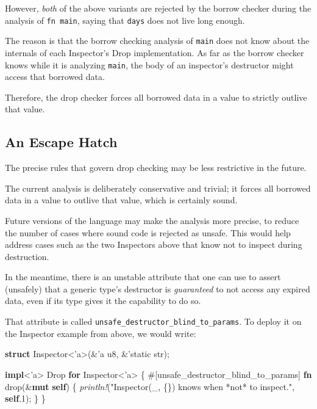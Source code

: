 \documentclass[a4paper,]{book}
\newenvironment{Shaded}{\begin{snugshade}}{\end{snugshade}}
\newcommand{\KeywordTok}[1]{\textcolor[rgb]{0.13,0.29,0.53}{\textbf{{#1}}}}
\newcommand{\DataTypeTok}[1]{\textcolor[rgb]{0.13,0.29,0.53}{{#1}}}
\newcommand{\DecValTok}[1]{\textcolor[rgb]{0.00,0.00,0.81}{{#1}}}
\newcommand{\StringTok}[1]{\textcolor[rgb]{0.31,0.60,0.02}{{#1}}}
\newcommand{\OtherTok}[1]{\textcolor[rgb]{0.56,0.35,0.01}{{#1}}}
\newcommand{\BuiltInTok}[1]{{#1}}
\newcommand{\PreprocessorTok}[1]{\textcolor[rgb]{0.56,0.35,0.01}{\textit{{#1}}}}
\newcommand{\AttributeTok}[1]{\textcolor[rgb]{0.77,0.63,0.00}{{#1}}}
\newcommand{\NormalTok}[1]{{#1}}
\begin{document}
However, \emph{both} of the above variants are rejected by the borrow
checker during the analysis of \texttt{fn\ main}, saying that
\texttt{days} does not live long enough.

The reason is that the borrow checking analysis of \texttt{main} does
not know about the internals of each Inspector's Drop implementation. As
far as the borrow checker knows while it is analyzing \texttt{main}, the
body of an inspector's destructor might access that borrowed data.

Therefore, the drop checker forces all borrowed data in a value to
strictly outlive that value.

\subsection{An Escape Hatch}\label{an-escape-hatch}

The precise rules that govern drop checking may be less restrictive in
the future.

The current analysis is deliberately conservative and trivial; it forces
all borrowed data in a value to outlive that value, which is certainly
sound.

Future versions of the language may make the analysis more precise, to
reduce the number of cases where sound code is rejected as unsafe. This
would help address cases such as the two Inspectors above that know not
to inspect during destruction.

In the meantime, there is an unstable attribute that one can use to
assert (unsafely) that a generic type's destructor is \emph{guaranteed}
to not access any expired data, even if its type gives it the capability
to do so.

That attribute is called \texttt{unsafe\_destructor\_blind\_to\_params}.
To deploy it on the Inspector example from above, we would write:

\begin{Shaded}
\begin{Highlighting}[]
\KeywordTok{struct} \NormalTok{Inspector<}\OtherTok{'a}\NormalTok{>(&}\OtherTok{'a} \DataTypeTok{u8}\NormalTok{, &}\OtherTok{'static} \DataTypeTok{str}\NormalTok{);}

\KeywordTok{impl}\NormalTok{<}\OtherTok{'a}\NormalTok{> }\BuiltInTok{Drop} \KeywordTok{for} \NormalTok{Inspector<}\OtherTok{'a}\NormalTok{> \{}
    \AttributeTok{#[}\NormalTok{unsafe_destructor_blind_to_params}\AttributeTok{]}
    \KeywordTok{fn} \NormalTok{drop(&}\KeywordTok{mut} \KeywordTok{self}\NormalTok{) \{}
        \PreprocessorTok{println!}\NormalTok{(}\StringTok{"Inspector(_, \{\}) knows when *not* to inspect."}\NormalTok{, }\KeywordTok{self}\NormalTok{.}\DecValTok{1}\NormalTok{);}
    \NormalTok{\}}
\NormalTok{\}}
\end{Highlighting}
\end{Shaded}
\end{document}
